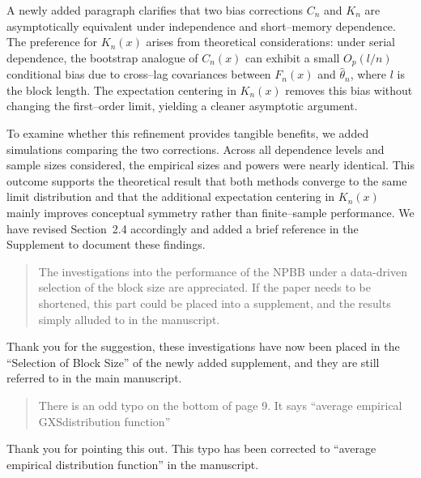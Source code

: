 \documentclass[12pt]{article}
\newenvironment{comment}%
{\begin{quotation}\noindent\small\it\color{darkblue}\ignorespaces%
}{\end{quotation}}
\begin{document}
A newly added paragraph clarifies that two bias corrections $C_n$ and
$K_n$ are asymptotically equivalent under independence and
short--memory dependence.  The preference for $K_n(x)$ arises from
theoretical considerations: under serial dependence, the bootstrap
analogue of $C_n(x)$ can exhibit a small $O_p(l/n)$ conditional bias
due to cross--lag covariances between $F_n(x)$ and $\hat\theta_n$,
where $l$ is the block length.  The expectation centering in $K_n(x)$
removes this bias without changing the first--order limit, yielding a
cleaner asymptotic argument.


To examine whether this refinement provides tangible benefits, we added
simulations comparing the two corrections.  Across all dependence levels
and sample sizes considered, the empirical sizes and powers were nearly
identical.  This outcome supports the theoretical result that both
methods converge to the same limit distribution and that the additional
expectation centering in $K_n(x)$ mainly improves conceptual symmetry
rather than finite--sample performance.  We have revised
Section~2.4 accordingly and added a brief reference in the Supplement to
document these findings.


\begin{comment}
The investigations into the performance of the NPBB under a
data-driven selection of the block size are appreciated.  If the paper
needs to be shortened, this part could be placed into a supplement,
and the results simply alluded to in the manuscript.
\end{comment}

Thank you for the suggestion, these investigations have now been
placed in the ``Selection of Block Size'' of the newly added
supplement, and they are still referred to in the main manuscript.

\begin{comment}
There is an odd typo on the bottom of page 9. It says ``average
empirical GXSdistribution function''
\end{comment}

Thank you for pointing this out. This typo has been
corrected to ``average empirical distribution function'' in the manuscript.





\end{document}
